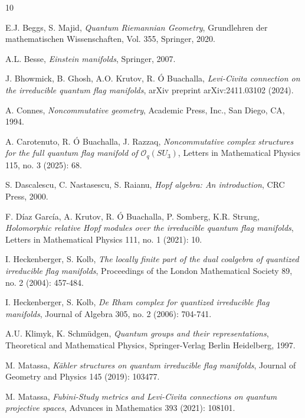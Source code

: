 \documentclass[a4paper,12pt,reqno,english]{amsart}
\numberwithin{equation}{section}
\numberwithin{figure}{section}
\theoremstyle{plain}
\theoremstyle{plain}
\theoremstyle{plain}
\theoremstyle{plain}
\theoremstyle{plain}
\theoremstyle{definition}
\theoremstyle{definition}
\theoremstyle{definition}
\theoremstyle{remark}
\theoremstyle{definition}
\begin{document}
\begin{thebibliography}{10}

E.J. Beggs, S. Majid,
\textit{Quantum Riemannian Geometry},
Grundlehren der mathematischen Wissenschaften, Vol. 355, Springer, 2020.

A.L. Besse,
\textit{Einstein manifolds},
Springer, 2007.

J. Bhowmick, B. Ghosh, A.O. Krutov, R. Ó Buachalla,
\textit{Levi-Civita connection on the irreducible quantum flag manifolds},
arXiv preprint arXiv:2411.03102 (2024).

A. Connes,
\textit{Noncommutative geometry},
Academic Press, Inc., San Diego, CA, 1994.

A. Carotenuto, R. Ó Buachalla, J. Razzaq,
\textit{Noncommutative complex structures for the full quantum flag manifold of $\mathcal{O}_q(SU_3)$},
Letters in Mathematical Physics 115, no. 3 (2025): 68.

S. Dascalescu, C. Nastasescu, S. Raianu,
\textit{Hopf algebra: An introduction},
CRC Press, 2000.

F. Díaz García, A. Krutov, R. Ó Buachalla, P. Somberg, K.R. Strung, \textit{Holomorphic relative Hopf modules over the irreducible quantum flag manifolds},
Letters in Mathematical Physics 111, no. 1 (2021): 10.

I. Heckenberger, S. Kolb,
\textit{The locally finite part of the dual coalgebra of quantized irreducible flag manifolds},
Proceedings of the London Mathematical Society 89, no. 2 (2004): 457-484.

I. Heckenberger, S. Kolb,
\textit{De Rham complex for quantized irreducible flag manifolds},
Journal of Algebra 305, no. 2 (2006): 704-741.

A.U. Klimyk, K. Schmüdgen,
\textit{Quantum groups and their representations},
Theoretical and Mathematical Physics, Springer-Verlag Berlin Heidelberg, 1997.

M. Matassa,
\textit{Kähler structures on quantum irreducible flag manifolds},
Journal of Geometry and Physics 145 (2019): 103477.

M. Matassa,
\textit{Fubini-Study metrics and Levi-Civita connections on quantum projective spaces},
Advances in Mathematics 393 (2021): 108101.


\end{thebibliography}
\end{document}
